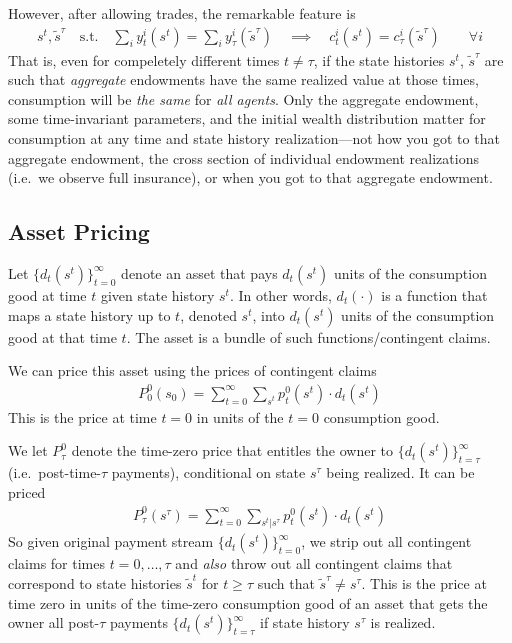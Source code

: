 \documentclass[12pt]{article}
\theoremstyle{plain}
\theoremstyle{definition}
\theoremstyle{remark}
\newcommand{\sumtinfz}{\sum^\infty_{t=0}}
\newcommand{\tinfz}{^\infty_{t=0}}
\begin{document}
However, after allowing trades, the remarkable feature is
\begin{align*}
  s^t, \tilde{s}^\tau
  \quad\text{s.t.}\quad
  \sum_i y_t^i(s^t)
  = \sum_i y_\tau^i(\tilde{s}^\tau)
  \quad\implies\quad
  c_t^i(s^t) = c_\tau^i(\tilde{s}^\tau)
  \qquad \forall i
\end{align*}
That is, even for compeletely different times $t\neq \tau$, if the state
histories $s^t$, $\tilde{s}^\tau$ are such that \emph{aggregate}
endowments have the same realized value at those times, consumption will
be \emph{the same} for \emph{all agents}.  Only the aggregate endowment,
some time-invariant parameters, and the initial wealth distribution
matter for consumption at any time and state history realization---not
how you got to that aggregate endowment, the cross section of individual
endowment realizations (i.e.\ we observe full insurance), or when you
got to that aggregate endowment.

\clearpage
\subsection{Asset Pricing}

Let $\{d_t(s^t)\}\tinfz$ denote an asset that pays $d_t(s^t)$ units of
the consumption good at time $t$ given state history $s^t$. In other
words, $d_t(\cdot)$ is a function that maps a state history up to $t$,
denoted $s^t$, into $d_t(s^t)$  units of the consumption good at that
time $t$. The asset is a bundle of such functions/contingent claims.

We can price this asset using the prices of contingent claims
\begin{align*}
  P_0^0(s_0)
  =
  \sumtinfz \sum_{s^t} p_t^0(s^t) \cdot d_t(s^t)
\end{align*}
This is the price at time $t=0$ in units of the $t=0$ consumption good.

We let $P^0_\tau$ denote the time-zero price that entitles the owner to
$\{d_t(s^t)\}_{t=\tau}^\infty$ (i.e.\ post-time-$\tau$ payments),
conditional on state $s^\tau$ being realized. It can be priced
\begin{align*}
  P_\tau^0(s^\tau)
  =
  \sumtinfz \sum_{s^t|s^\tau} p_t^0(s^t) \cdot d_t(s^t)
\end{align*}
So given original payment stream $\{d_t(s^t)\}\tinfz$, we strip out all
contingent claims for times $t=0,\ldots,\tau$ and \emph{also}
throw out all contingent claims that correspond to state histories
$\tilde{s}^t$ for $t\geq \tau$ such that $\tilde{s}^\tau \neq s^\tau$.
This is the price at time zero in units of the time-zero consumption
good of an asset that gets the owner all post-$\tau$ payments
$\{d_t(s^t)\}^\infty_{t=\tau}$ if state history $s^\tau$ is realized.
\end{document}
